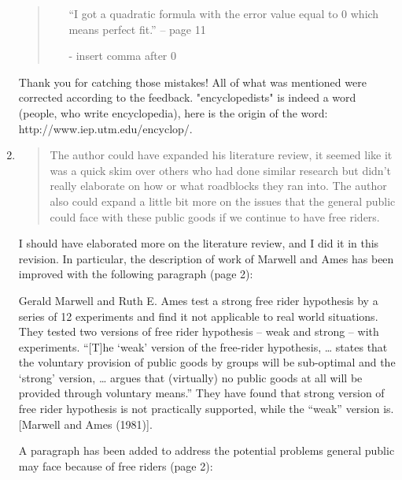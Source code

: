 \documentclass{article}
\newenvironment{itquote}
	{\begin{quote}\itshape}
	{\end{quote}\ignorespacesafterend}
\newenvironment{itpars}
	{\par\itshape}
	{\par}
\begin{document}
\begin{enumerate}
\begin{itquote}
\begin{itemize}
							“I got a quadratic formula with the error value equal to 0 which means perfect fit.” – page 11
							
							- insert comma after 0

					\end{itemize}


				\end{itquote}

				Thank you for catching those mistakes! All of what was mentioned were corrected according to the feedback. "encyclopedists" is indeed a word (people, who write encyclopedia), here is the origin of the word: http://www.iep.utm.edu/encyclop/.

			\item

				\begin{itquote}

					The author could have expanded his literature review, it seemed like it was a quick skim over others who had done similar research but didn't really elaborate on how or what roadblocks they ran into. The author also could expand a little bit more on the issues that the general public could face with these public goods if we continue to have free riders.

				\end{itquote}

				I should have elaborated more on the literature review, and I did it in this revision. In particular, the description of work of Marwell and Ames has been improved with the following paragraph (page 2):

				\begin{itpars}

					Gerald Marwell and Ruth E. Ames test a strong free rider hypothesis by a series of 12 experiments and find it not applicable to real world situations. They tested two versions of free rider hypothesis – weak and strong – with experiments. “[T]he ‘weak’ version of the free-rider hypothesis, … states that the voluntary provision of public goods by groups will be sub-optimal and the ‘strong’ version, … argues that (virtually) no public goods at all will be provided through voluntary means.” They have found that strong version of free rider hypothesis is not practically supported, while the “weak” version is. [Marwell and Ames (1981)].

				\end{itpars}

				A paragraph has been added to address the potential problems general public may face because of free riders (page 2):


\end{enumerate}
\end{document}
